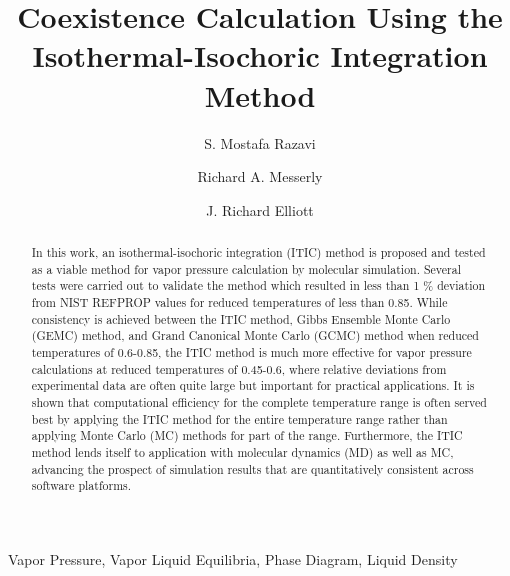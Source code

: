 \documentclass[5p,times]{elsarticle}
\begin{document}
\begin{frontmatter}

\title{Coexistence Calculation Using the Isothermal-Isochoric Integration Method}

\author{S. Mostafa Razavi}
\address{Department of Chemical and Biomolecular Engineering, The University of Akron, Akron, Ohio 44325, USA}

\author{Richard A. Messerly}
\address{Thermodynamics Research Center, National Institute of Standards and Technology, Boulder, Colorado 80305, USA}



\author{J. Richard Elliott }
\address{Department of Chemical and Biomolecular Engineering, The University of Akron, Akron, Ohio 44325, USA}

\begin{abstract}
In this work, an isothermal-isochoric integration (ITIC) method is proposed and tested as a viable method for vapor pressure calculation by molecular simulation. Several tests were carried out to validate the method which resulted in less than 1 \% deviation from NIST REFPROP values for reduced temperatures of less than 0.85. While consistency is achieved between the ITIC method, Gibbs Ensemble Monte Carlo (GEMC) method, and Grand Canonical Monte Carlo (GCMC) method when reduced temperatures of 0.6-0.85, the ITIC method is much more effective for vapor pressure calculations at reduced temperatures of 0.45-0.6, where relative deviations from experimental data are often quite large but important for practical applications. It is shown that computational efficiency for the complete temperature range is often served best by applying the ITIC method for the entire temperature range rather than applying Monte Carlo (MC) methods for part of the range. Furthermore, the ITIC method lends itself to application with molecular dynamics (MD) as well as MC, advancing the prospect of simulation results that are quantitatively consistent across software platforms.
\end{abstract}

\begin{keyword}
Vapor Pressure, Vapor Liquid Equilibria, Phase Diagram, Liquid Density
\end{keyword}

\end{frontmatter}
\end{document}
